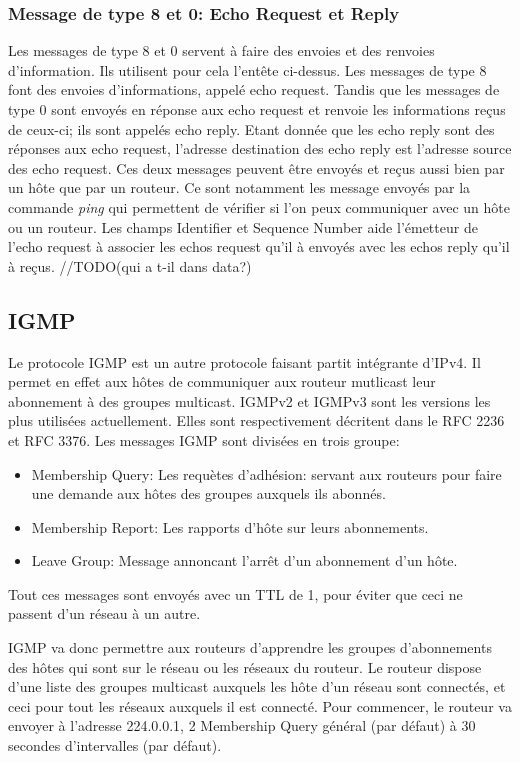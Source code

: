 \subsubsection{Message de type 8 et 0: Echo Request et Reply} Les messages de type 8 et 0 servent à
faire des envoies et des renvoies d'information. Ils utilisent pour cela
l'entête ci-dessus. Les messages de type 8 font des envoies d'informations,
appelé echo request. Tandis que les messages de type 0 sont envoyés en réponse
aux echo request et renvoie les informations reçus de ceux-ci; ils sont appelés
echo reply. Etant donnée que les echo reply sont des réponses aux echo request,
l'adresse destination des echo reply est l'adresse source des echo request. Ces
deux messages peuvent être envoyés et reçus aussi bien par un hôte que par un
routeur. Ce sont notamment les message envoyés par la commande {\it ping} qui
permettent de vérifier si l'on peux communiquer avec un hôte ou un routeur.  Les
champs Identifier et Sequence Number aide l'émetteur de l'echo request à
associer les echos request qu'il à envoyés avec les echos reply qu'il à reçus.
//TODO(qui a t-il dans data?)

\subsection{IGMP}
Le protocole IGMP est un autre protocole faisant partit intégrante d'IPv4. Il permet en effet aux hôtes
de communiquer aux routeur mutlicast leur abonnement à des groupes multicast.
IGMPv2 et IGMPv3 sont les versions les plus utilisées actuellement. Elles sont
respectivement décritent dans le RFC 2236 et RFC 3376.
Les messages IGMP sont divisées en trois groupe:
\begin{itemize}
\item Membership Query: Les requètes d'adhésion: servant aux routeurs pour faire
une demande aux hôtes des groupes auxquels ils abonnés.
\item Membership Report: Les rapports d'hôte sur leurs abonnements.
\item Leave Group: Message annoncant l'arrêt d'un abonnement d'un hôte.
\end{itemize}
Tout ces messages sont envoyés avec un TTL de 1, pour éviter que ceci ne passent
d'un réseau à un autre.

IGMP va donc permettre aux routeurs d'apprendre les groupes d'abonnements des hôtes qui
sont sur le réseau ou les réseaux du routeur.
Le routeur dispose d'une liste des groupes multicast auxquels les hôte d'un réseau sont connectés,
et ceci pour tout les réseaux auxquels il est connecté.
Pour commencer, le routeur va envoyer à l'adresse 224.0.0.1, 2 Membership Query général
(par défaut) à 30 secondes d'intervalles (par défaut).

